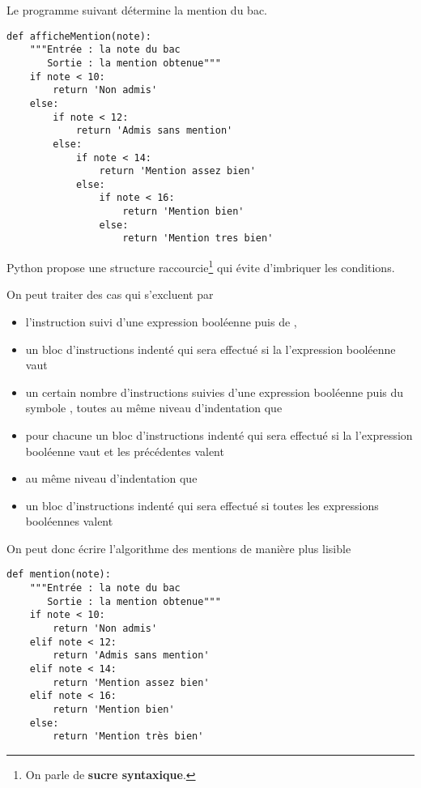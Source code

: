 Le programme suivant détermine la mention du bac.
\begin{lstlisting}
def afficheMention(note):
    """Entrée : la note du bac
       Sortie : la mention obtenue"""
    if note < 10:
        return 'Non admis'
    else:
        if note < 12:
            return 'Admis sans mention'
        else:
            if note < 14:
                return 'Mention assez bien'
            else:
                if note < 16:
                    return 'Mention bien'
                else:
                    return 'Mention tres bien'
\end{lstlisting}
Python propose une structure raccourcie\footnote{On parle de {\bf sucre syntaxique}.} qui évite d'imbriquer les conditions. 
\begin{defin}
On peut traiter des cas qui s'excluent par 
\begin{itemize}
 \item l'instruction  suivi d'une expression booléenne puis de \type{:},
 \item un bloc d'instructions indenté qui sera effectué si la l'expression booléenne vaut 
 \item un certain nombre d'instructions  suivies d'une expression booléenne puis du symbole \type{:}, toutes au même niveau d'indentation que 
  \item pour chacune un bloc d'instructions indenté qui sera effectué si la l'expression booléenne vaut  et les précédentes valent 
    \item {} au même niveau d'indentation que 
  \item un bloc d'instructions indenté qui sera effectué si toutes les expressions booléennes valent 
\end{itemize}
\end{defin}
On peut donc écrire l'algorithme des mentions de manière plus lisible
\begin{lstlisting}
def mention(note):
    """Entrée : la note du bac
       Sortie : la mention obtenue"""
    if note < 10:
        return 'Non admis'
    elif note < 12:
        return 'Admis sans mention'
    elif note < 14:
        return 'Mention assez bien'
    elif note < 16:
        return 'Mention bien'
    else:
        return 'Mention très bien'
\end{lstlisting}
